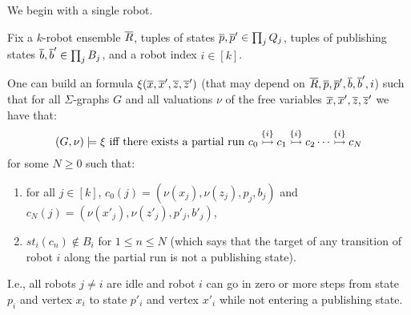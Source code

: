 We begin with a single robot.

\begin{lemma} \label{lem:zeta} 
Fix a $k$-robot ensemble $\tup{R}$, tuples of states $\tup{p},\tup{p}' \in \prod_j Q_j$, tuples of publishing states 
$\tup{b},\tup{b}' \in \prod_j B_j$, and a robot index $i \in [k]$.

One can build an \msol formula $\xi(\tup{x},\tup{x}',\tup{z},\tup{z}')$ (that may depend on $\tup{R}, \tup{p}, \tup{p}', \tup{b}, \tup{b}', i$) such that for all $\Sigma$-graphs $G$ and all valuations $\nu$ of the free variables $\tup{x},\tup{x}',\tup{z},\tup{z}'$ we have that:
\[
 (G,\nu) \models \xi \mbox{ iff there exists a partial run
$\onestep{c_0}{c_1}{\{i\}}\onestep{}{c_2}{\{i\}} \cdots \onestep{}{c_N}{\{i\}}$} 
\]
for some $N \geq 0$ such that:

 \begin{enumerate}
 \item for all $j \in [k]$, $c_0(j) = 	(\nu(x_j),	\nu(z_j),		p_j,		b_j)$ and $c_N(j) =	(\nu(x'_j),	\nu(z'_j),	p'_j,	b'_j)$,
 \item $st_i(c_n) \not \in B_i$ for $1 \leq n \leq N$ (which says that the target of any transition of robot $i$ along the partial run is not a publishing state).
 \end{enumerate}
I.e., all robots $j \neq i$ are idle and robot $i$ can go in zero or more steps from state $p_i$ and vertex $x_i$ to state $p'_i$ and vertex $x'_i$ while not entering a publishing state.
\end{lemma}

